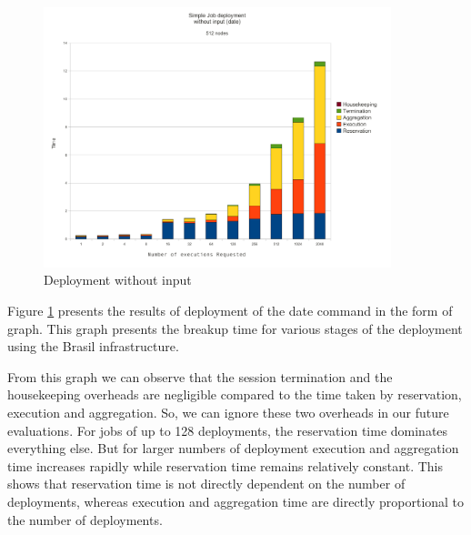 \begin{figure}
  \begin{center}
    \leavevmode
      \includegraphics[height=0.4\textheight,width=0.9\textwidth]
		{./img/date_graph}
    \caption{Deployment without input}
    \label{fig:date_graph}
  \end{center}
\end{figure}

Figure \ref{fig:date_graph} presents the results of deployment of the date
command in the form of graph.  This graph presents the breakup time for various
stages of the deployment using the Brasil infrastructure.

From this graph we can observe that the session termination and the housekeeping
overheads are negligible compared to the time taken by reservation, execution
and aggregation.  So, we can ignore these two overheads in our future
evaluations.  For jobs of up to 128 deployments, the reservation time dominates
everything else.  But for larger numbers of deployment execution and
aggregation time increases rapidly while reservation time remains relatively
constant. This shows that reservation time is not directly dependent on
the number of deployments, whereas execution and aggregation time are directly
proportional to the number of deployments.

